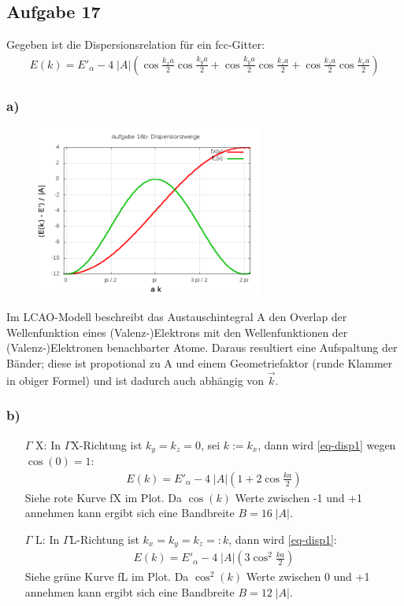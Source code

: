 \subsection*{Aufgabe 17}
Gegeben ist die Dispersionsrelation für ein fcc-Gitter:
\begin{align}
\label{eq-disp1}
  E(k) = E'_\alpha - 4\;|A| \left(\cos\frac{k_x a}{2}\cos\frac{k_y a}{2} +
    \cos\frac{k_y a}{2}\cos\frac{k_z a}{2} + \cos\frac{k_z a}{2}\cos\frac{k_x a}{2} \right)
\end{align}

\subsubsection*{a)}
\begin{figure}
  \centering
  \includegraphics[width=7.5cm]{aufgabe16b.png}
\label{bild16b}
\end{figure}
Im LCAO-Modell beschreibt das Austauschintegral A den Overlap der Wellenfunktion
eines (Valenz-)Elektrons mit den Wellenfunktionen der (Valenz-)Elektronen benachbarter
Atome. Daraus resultiert eine Aufspaltung der Bänder; diese ist propotional zu A
und einem Geometriefaktor (runde Klammer in obiger Formel) und ist dadurch
auch abhängig von $\vec k$.
\newline
\subsubsection*{b)}
\begin{itemize}
\item[$\Gamma$ X:]
  In $\Gamma$X-Richtung ist $k_y = k_z = 0$, sei $k:= k_x$, dann wird \eqref{eq-disp1}
  wegen $\cos(0) = 1$:
\begin{align*}
    E(k) = E'_\alpha - 4\;|A| \left(1 + 2 \cos\frac{k a}{2} \right)
\end{align*}
Siehe rote Kurve fX im Plot. Da $\cos(k)$ Werte zwischen -1 und +1 annehmen kann
ergibt sich eine Bandbreite $B = 16\;|A|$.
\item[$\Gamma$ L:]
  In $\Gamma$L-Richtung ist $k_x = k_y = k_z =: k$, dann wird \eqref{eq-disp1}:
\begin{align*}
    E(k) = E'_\alpha - 4\;|A| \left(3 \cos^2\frac{k a}{2} \right)
\end{align*}
Siehe grüne Kurve fL im Plot. Da $\cos^2(k)$ Werte zwischen 0 und +1 annehmen kann
ergibt sich eine Bandbreite $B = 12\;|A|$.
\end{itemize}


